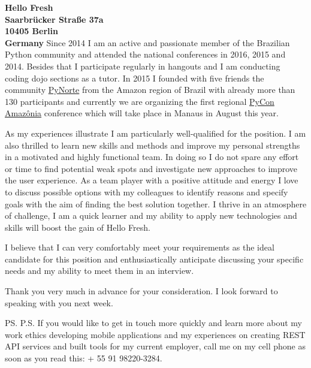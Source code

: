 \documentclass[a4paper]{joaosoares-letter}
\begin{document}
\begin{letter}{\bfseries Hello Fresh\\Saarbrücker Straße 37a\\10405  Berlin\\Germany}
Since 2014 I am an active and passionate member of the Brazilian Python community and attended the national conferences in 2016, 2015 and 2014. Besides that I participate regularly in hangouts and I am conducting coding dojo sections as a tutor. In 2015 I founded with five friends the community \href{http://pynorte.python.org.br}{PyNorte} from the Amazon region of Brazil with already more than 130 participants and currently we are organizing the first regional \href{http://amazonia.python.org.br/}{PyCon Amazônia} conference which will take place in Manaus in August this year.

As my experiences illustrate I am particularly well-qualified for the position. I am also thrilled to learn new skills and methods and improve my personal strengths in a motivated and highly functional team. In doing so I do not spare any effort or time to find potential weak spots and investigate new approaches to improve the user experience. As a team player with a positive attitude and energy I love to discuss possible options with my colleagues to identify reasons and specify goals with the aim of finding the best solution together. I thrive in an atmosphere of challenge, I am a quick learner and my ability to apply new technologies and skills will boost the gain of Hello Fresh.

I believe that I can very comfortably meet your requirements as the ideal candidate for this position and enthusiastically anticipate discussing your specific needs and my ability to meet them in an interview.


\closing{ Thank you very much in advance for your consideration. I look forward to speaking with you next week.}
\vspace{10pt}
\ps
P.S. If you would like to get in touch more quickly and learn more about my work ethics developing mobile applications and my experiences on creating REST API services and built tools for my current employer, call me on my cell phone as soon as you read this: + 55 91 98220-3284.
\vspace{\fill}

\end{letter}
\end{document}
